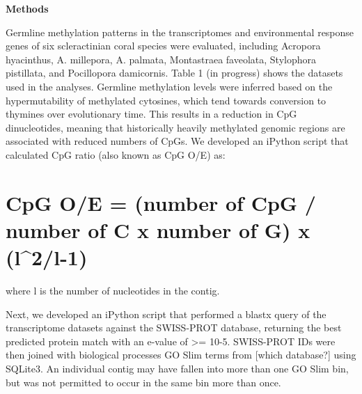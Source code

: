 \textbf{Methods}

Germline methylation patterns in the transcriptomes and environmental response genes of six scleractinian coral species were evaluated, including Acropora hyacinthus, A. millepora, A. palmata, Montastraea faveolata, Stylophora pistillata, and Pocillopora damicornis. Table 1 (in progress) shows the datasets used in the analyses. Germline methylation levels were inferred based on the hypermutability of methylated cytosines, which tend towards conversion to thymines over evolutionary time. This results in a reduction in CpG dinucleotides, meaning that historically heavily methylated genomic regions are associated with reduced numbers of CpGs. We developed an iPython script that calculated CpG ratio (also known as CpG O/E) as:

\section{CpG O/E = (number of CpG / number of C x number of G) x (l^2/l-1)}


where l is the number of nucleotides in the contig.

Next, we developed an iPython script that performed a blastx query of the transcriptome datasets against the SWISS-PROT database, returning the best predicted protein match with an e-value of >= 10-5. SWISS-PROT IDs were then joined with biological processes GO Slim terms from [which database?] using SQLite3. An individual contig may have fallen into more than one GO Slim bin, but was not permitted to occur in the same bin more than once.
